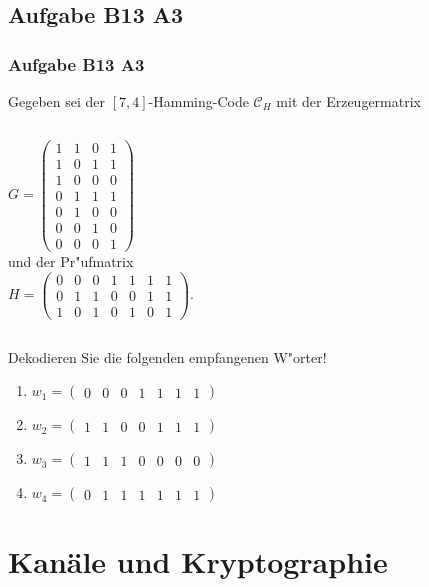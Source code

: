\subsection{Aufgabe B13 A3}
\begin{frame}
\frametitle{Aufgabe B13 A3}
Gegeben sei der $[7,4]$-Hamming-Code $\mathcal{C}_H$ mit der Erzeugermatrix\\[4pt]
\begin{columns}
$G = \left( \begin{array}{cccc}
1 & 1 & 0 & 1 \\
1 & 0 & 1 & 1 \\
1 & 0 & 0 & 0 \\
0 & 1 & 1 & 1 \\
0 & 1 & 0 & 0 \\
0 & 0 & 1 & 0 \\
0 & 0 & 0 & 1
\end{array} \right)$\\[4pt]
und der Pr"ufmatrix\\[4pt]
$H = \left( \begin{array}{ccccccc}
0 & 0 & 0 & 1 & 1 & 1 & 1 \\
0 & 1 & 1 & 0 & 0 & 1 & 1 \\
1 & 0 & 1 & 0 & 1 & 0 & 1
\end{array} \right)$.\\[4pt]
\end{columns}
\vspace{0.5cm}
Dekodieren Sie die folgenden empfangenen W"orter!
\begin{enumerate}
\item $w_1 = (\begin{array}{ccccccc}0 & 0 & 0 & 1 & 1 & 1 & 1\end{array})$
\item $w_2 = (\begin{array}{ccccccc}1 & 1 & 0 & 0 & 1 & 1 & 1\end{array})$
\item $w_3 = (\begin{array}{ccccccc}1 & 1 & 1 & 0 & 0 & 0 & 0\end{array})$
\item $w_4 = (\begin{array}{ccccccc}0 & 1 & 1 & 1 & 1 & 1 & 1\end{array})$
\end{enumerate}
\end{frame}

\section{Kanäle und Kryptographie}
